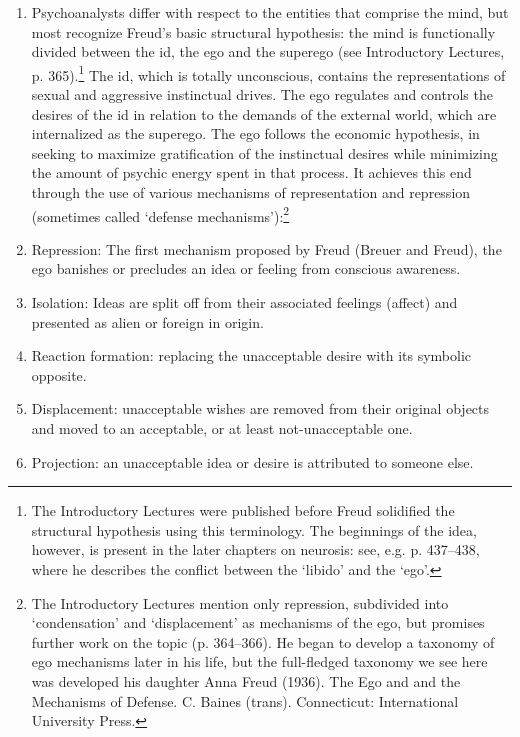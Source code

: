 \begin{enumerate}
\item Psychoanalysts differ with respect to the entities that comprise the mind, but most recognize Freud's basic structural hypothesis: the mind is functionally divided between the id, the ego and the superego (see Introductory Lectures, p. 365).\footnote{The Introductory Lectures were published before Freud solidified the structural hypothesis using this terminology. The beginnings of the idea, however, is present in the later chapters on neurosis: see, e.g. p. 437--438, where he describes the conflict between the `libido' and the `ego'.} The id, which is totally unconscious, contains the representations of sexual and aggressive instinctual drives. The ego regulates and controls the desires of the id in relation to the demands of the external world, which are internalized as the superego. The ego follows the economic hypothesis, in seeking to maximize gratification of the instinctual desires while minimizing the amount of psychic energy spent in that process. It achieves this end through the use of various mechanisms of representation and repression (sometimes called `defense mechanisms'):\footnote{The Introductory Lectures mention only repression, subdivided into `condensation' and `displacement' as mechanisms of the ego, but promises further work on the topic (p. 364--366). He began to develop a taxonomy of ego mechanisms later in his life, but the full-fledged taxonomy we see here was developed his daughter Anna Freud (1936). The Ego and and the Mechanisms of Defense. C. Baines (trans). Connecticut: International University Press.}

\item Repression: The first mechanism proposed by Freud (Breuer and Freud), the ego banishes or precludes an idea or feeling from conscious awareness.

\item Isolation: Ideas are split off from their associated feelings (affect) and presented as alien or foreign in origin.

\item Reaction formation: replacing the unacceptable desire with its symbolic opposite.

\item Displacement: unacceptable wishes are removed from their original objects and moved to an acceptable, or at least not-unacceptable one.

\item Projection: an unacceptable idea or desire is attributed to someone else.


\end{enumerate}
